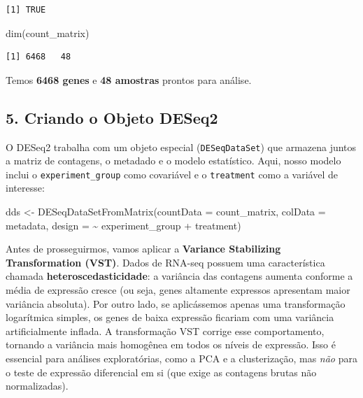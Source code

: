 \documentclass[
  letterpaper,
  DIV=11,
  numbers=noendperiod]{scrreprt}
\newenvironment{Shaded}{\begin{snugshade}}{\end{snugshade}}
\newcommand{\AttributeTok}[1]{\textcolor[rgb]{0.40,0.45,0.13}{#1}}
\newcommand{\FunctionTok}[1]{\textcolor[rgb]{0.28,0.35,0.67}{#1}}
\newcommand{\NormalTok}[1]{\textcolor[rgb]{0.00,0.23,0.31}{#1}}
\newcommand{\OtherTok}[1]{\textcolor[rgb]{0.00,0.23,0.31}{#1}}
\newcommand{\SpecialCharTok}[1]{\textcolor[rgb]{0.37,0.37,0.37}{#1}}
\begin{document}
\begin{verbatim}
[1] TRUE
\end{verbatim}

\begin{Shaded}
\begin{Highlighting}[]
\FunctionTok{dim}\NormalTok{(count\_matrix)}
\end{Highlighting}
\end{Shaded}

\begin{verbatim}
[1] 6468   48
\end{verbatim}

Temos \textbf{6468 genes} e \textbf{48 amostras} prontos para análise.

\subsection{5. Criando o Objeto DESeq2}\label{criando-o-objeto-deseq2}

O DESeq2 trabalha com um objeto especial (\texttt{DESeqDataSet}) que
armazena juntos a matriz de contagens, o metadado e o modelo
estatístico. Aqui, nosso modelo inclui o \texttt{experiment\_group} como
covariável e o \texttt{treatment} como a variável de interesse:

\begin{Shaded}
\begin{Highlighting}[]
\NormalTok{dds }\OtherTok{\textless{}{-}} \FunctionTok{DESeqDataSetFromMatrix}\NormalTok{(}\AttributeTok{countData =}\NormalTok{ count\_matrix,}
                              \AttributeTok{colData =}\NormalTok{ metadata,}
                              \AttributeTok{design =} \SpecialCharTok{\textasciitilde{}}\NormalTok{ experiment\_group }\SpecialCharTok{+}\NormalTok{ treatment)}
\end{Highlighting}
\end{Shaded}

Antes de prosseguirmos, vamos aplicar a \textbf{Variance Stabilizing
Transformation (VST)}. Dados de RNA-seq possuem uma característica
chamada \textbf{heteroscedasticidade}: a variância das contagens aumenta
conforme a média de expressão cresce (ou seja, genes altamente expressos
apresentam maior variância absoluta). Por outro lado, se aplicássemos
apenas uma transformação logarítmica simples, os genes de baixa
expressão ficariam com uma variância artificialmente inflada. A
transformação VST corrige esse comportamento, tornando a variância mais
homogênea em todos os níveis de expressão. Isso é essencial para
análises exploratórias, como a PCA e a clusterização, mas \emph{não}
para o teste de expressão diferencial em si (que exige as contagens
brutas não normalizadas).
\end{document}
